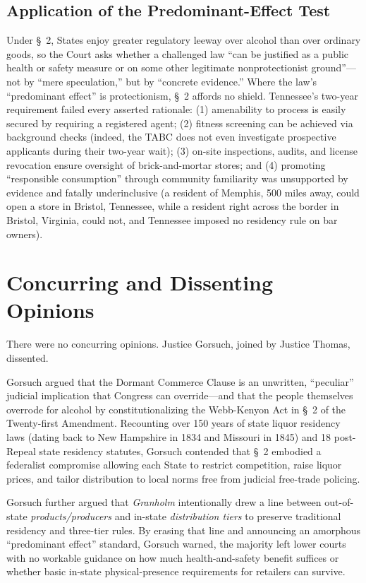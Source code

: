 \documentclass[12pt]{article}
\begin{document}
\subsection{Application of the Predominant-Effect Test}
Under \S~2, States enjoy greater regulatory leeway over alcohol than over ordinary goods, so the Court asks whether a challenged law ``can be justified as a public health or safety measure or on some other legitimate nonprotectionist ground''---not by ``mere speculation,'' but by ``concrete evidence.'' Where the law's ``predominant effect'' is protectionism, \S~2 affords no shield. Tennessee's two-year requirement failed every asserted rationale: (1) amenability to process is easily secured by requiring a registered agent; (2) fitness screening can be achieved via background checks (indeed, the TABC does not even investigate prospective applicants during their two-year wait); (3) on-site inspections, audits, and license revocation ensure oversight of brick-and-mortar stores; and (4) promoting ``responsible consumption'' through community familiarity was unsupported by evidence and fatally underinclusive (a resident of Memphis, 500 miles away, could open a store in Bristol, Tennessee, while a resident right across the border in Bristol, Virginia, could not, and Tennessee imposed no residency rule on bar owners).

\section{Concurring and Dissenting Opinions}

There were no concurring opinions. Justice Gorsuch, joined by Justice Thomas, dissented.

Gorsuch argued that the Dormant Commerce Clause is an unwritten, ``peculiar'' judicial implication that Congress can override---and that the people themselves overrode for alcohol by constitutionalizing the Webb-Kenyon Act in \S~2 of the Twenty-first Amendment. Recounting over 150 years of state liquor residency laws (dating back to New Hampshire in 1834 and Missouri in 1845) and 18 post-Repeal state residency statutes, Gorsuch contended that \S~2 embodied a federalist compromise allowing each State to restrict competition, raise liquor prices, and tailor distribution to local norms free from judicial free-trade policing.

Gorsuch further argued that \textit{Granholm} intentionally drew a line between out-of-state \textit{products/producers} and in-state \textit{distribution tiers} to preserve traditional residency and three-tier rules. By erasing that line and announcing an amorphous ``predominant effect'' standard, Gorsuch warned, the majority left lower courts with no workable guidance on how much health-and-safety benefit suffices or whether basic in-state physical-presence requirements for retailers can survive.
\end{document}
